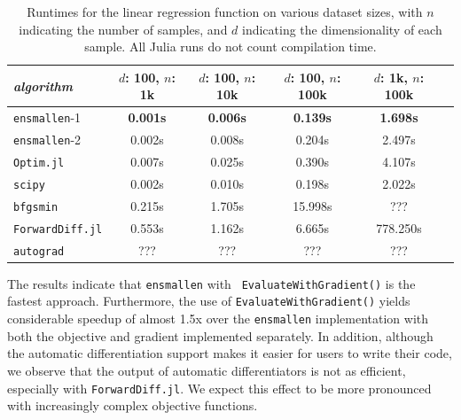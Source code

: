 \documentclass{article}
\begin{document}
\begin{table}
\centering
\begin{adjustbox}{scale={0.90}{0.90}}
\begin{tabular}{lccccc}
\toprule
{\em algorithm} & $d$: 100, $n$: 1k & $d$: 100, $n$: 10k & $d$: 100, $n$:
100k & $d$: 1k, $n$: 100k \\
\midrule
{\tt ensmallen}-1 & {\bf 0.001s} & {\bf 0.006s} & {\bf 0.139s} & {\bf 1.698s} \\
{\tt ensmallen}-2 & 0.002s & 0.008s & 0.204s & 2.497s \\
{\tt Optim.jl} & 0.007s & 0.025s & 0.390s & 4.107s \\
{\tt scipy} & 0.002s & 0.010s & 0.198s & 2.022s \\
{\tt bfgsmin} & 0.215s & 1.705s & 15.998s & ??? \\
{\tt ForwardDiff.jl} & 0.553s & 1.162s & 6.665s & 778.250s \\
{\tt autograd} & ??? & ??? & ??? & ??? \\
\bottomrule
\end{tabular}
\end{adjustbox}
\vspace*{0.25ex}
\caption{\footnotesize
Runtimes for the linear regression function on various dataset sizes,
with $n$ indicating the number of samples,
and $d$ indicating the dimensionality of each sample.
All Julia runs do not count compilation time.}
\label{tab:lbfgs}
\end{table}

The results indicate that \texttt{\small ensmallen} with \texttt{\small
EvaluateWithGradient()} is the fastest approach.
Furthermore, the use of \texttt{\small EvaluateWithGradient()} yields considerable
speedup of almost 1.5x over the \texttt{\small ensmallen} implementation with both the
objective and gradient implemented separately.  In addition, although the
automatic differentiation support makes it easier for users to write their
code, we observe that the output of automatic differentiators is not as
efficient, especially with \texttt{\small ForwardDiff.jl}.  We expect this
effect to be more pronounced with increasingly complex objective functions.
\end{document}
